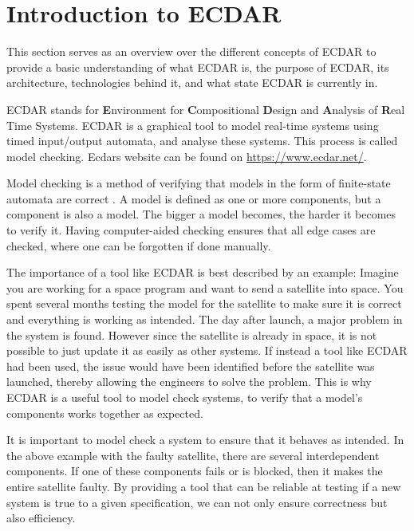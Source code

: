 \section{Introduction to ECDAR}\label{sec:introduction-to-ecdar}
\commondisclaimer

This section serves as an overview over the different concepts of ECDAR to provide a basic understanding of what ECDAR is, the purpose of ECDAR, its architecture, technologies behind it, and what state ECDAR is currently in.

ECDAR stands for \textbf{E}nvironment for \textbf{C}ompositional \textbf{D}esign and \textbf{A}nalysis of \textbf{R}eal Time Systems.
ECDAR is a graphical tool to model real-time systems using timed input/output automata, and analyse these systems. 
This process is called model checking. Ecdars website can be found on \href{https://www.ecdar.net/}{https://www.ecdar.net/}.

Model checking is a method of verifying that models in the form of finite-state automata are correct \cite{modelchecking-handbook}. A model is defined as one or more components, but a component is also a model.
The bigger a model becomes, the harder it becomes to verify it. 
Having computer-aided checking ensures that all edge cases are checked, where one can be forgotten if done manually.
 
The importance of a tool like ECDAR is best described by an example:
Imagine you are working for a space program and want to send a satellite into space.
You spent several months testing the model for the satellite to make sure it is correct and everything is working as intended.
The day after launch, a major problem in the system is found. However since the satellite is already in space, it is not possible to just update it as easily as other systems. If instead a tool like ECDAR had been used, the issue would have been identified before the satellite was launched, thereby allowing the engineers to solve the problem.
This is why ECDAR is a useful tool to model check systems, to verify that a model's components works together as expected.



It is important to model check a system to ensure that it behaves as intended.
In the above example with the faulty satellite, there are several interdependent components.
If one of these components fails or is blocked, then it makes the entire satellite faulty.
By providing a tool that can be reliable at testing if a new system is true to a given specification, we can not only ensure correctness but also efficiency.


